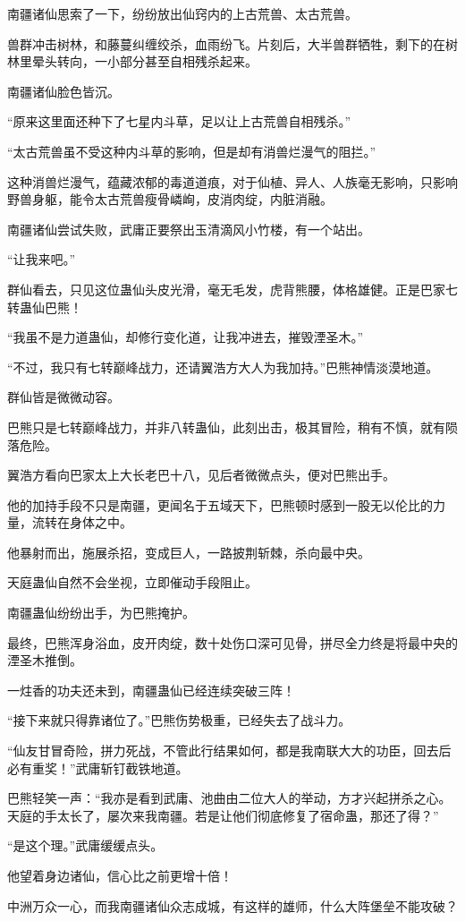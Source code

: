 \begin{this_body}
南疆诸仙思索了一下，纷纷放出仙窍内的上古荒兽、太古荒兽。

兽群冲击树林，和藤蔓纠缠绞杀，血雨纷飞。片刻后，大半兽群牺牲，剩下的在树林里晕头转向，一小部分甚至自相残杀起来。

南疆诸仙脸色皆沉。

“原来这里面还种下了七星内斗草，足以让上古荒兽自相残杀。”

“太古荒兽虽不受这种内斗草的影响，但是却有消兽烂漫气的阻拦。”

这种消兽烂漫气，蕴藏浓郁的毒道道痕，对于仙植、异人、人族毫无影响，只影响野兽身躯，能令太古荒兽瘦骨嶙峋，皮消肉绽，内脏消融。

南疆诸仙尝试失败，武庸正要祭出玉清滴风小竹楼，有一个站出。

“让我来吧。”

群仙看去，只见这位蛊仙头皮光滑，毫无毛发，虎背熊腰，体格雄健。正是巴家七转蛊仙巴熊！

“我虽不是力道蛊仙，却修行变化道，让我冲进去，摧毁湮圣木。”

“不过，我只有七转巅峰战力，还请翼浩方大人为我加持。”巴熊神情淡漠地道。

群仙皆是微微动容。

巴熊只是七转巅峰战力，并非八转蛊仙，此刻出击，极其冒险，稍有不慎，就有陨落危险。

翼浩方看向巴家太上大长老巴十八，见后者微微点头，便对巴熊出手。

他的加持手段不只是南疆，更闻名于五域天下，巴熊顿时感到一股无以伦比的力量，流转在身体之中。

他暴射而出，施展杀招，变成巨人，一路披荆斩棘，杀向最中央。

天庭蛊仙自然不会坐视，立即催动手段阻止。

南疆蛊仙纷纷出手，为巴熊掩护。

最终，巴熊浑身浴血，皮开肉绽，数十处伤口深可见骨，拼尽全力终是将最中央的湮圣木推倒。

一炷香的功夫还未到，南疆蛊仙已经连续突破三阵！

“接下来就只得靠诸位了。”巴熊伤势极重，已经失去了战斗力。

“仙友甘冒奇险，拼力死战，不管此行结果如何，都是我南联大大的功臣，回去后必有重奖！”武庸斩钉截铁地道。

巴熊轻笑一声：“我亦是看到武庸、池曲由二位大人的举动，方才兴起拼杀之心。天庭的手太长了，屡次来我南疆。若是让他们彻底修复了宿命蛊，那还了得？”

“是这个理。”武庸缓缓点头。

他望着身边诸仙，信心比之前更增十倍！

中洲万众一心，而我南疆诸仙众志成城，有这样的雄师，什么大阵堡垒不能攻破？

\end{this_body}


